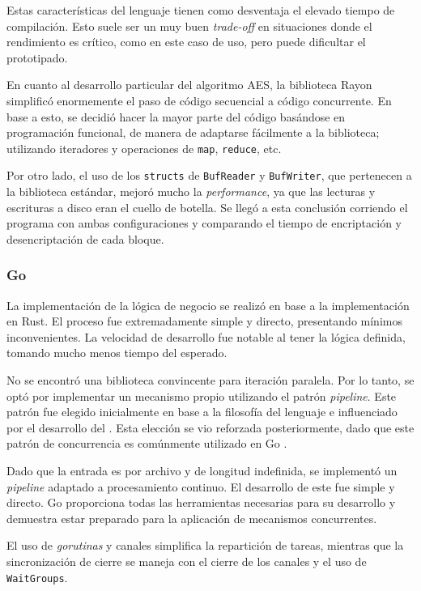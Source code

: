 \documentclass[11pt]{article}
\let\Oldsubsubsection\subsubsection
\renewcommand{\subsubsection}{\FloatBarrier\Oldsubsubsection}
\newcommand{\english}[1]{\textit{#1}}
\begin{document}
Estas características del lenguaje tienen como desventaja el elevado tiempo de compilación. Esto suele ser un muy buen \english{trade-off} en situaciones donde el rendimiento es crítico, como en este caso de uso, pero puede dificultar el prototipado.

En cuanto al desarrollo particular del algoritmo AES, la biblioteca Rayon simplificó enormemente el paso de código secuencial a código concurrente. En base a esto, se decidió hacer la mayor parte del código basándose en programación funcional, de manera de adaptarse fácilmente a la biblioteca; utilizando iteradores y operaciones de \lstinline{map}, \lstinline{reduce}, etc.

Por otro lado, el uso de los \lstinline{structs} de \lstinline{BufReader} y \lstinline{BufWriter}, que pertenecen a la biblioteca estándar, mejoró mucho la \english{performance}, ya que las lecturas y escrituras a disco eran el cuello de botella. Se llegó a esta conclusión corriendo el programa con ambas configuraciones y comparando el tiempo de encriptación y desencriptación de cada bloque.

\subsubsection{Go}


La implementación de la lógica de negocio se realizó en base a la implementación en Rust. El proceso fue extremadamente simple y directo, presentando mínimos inconvenientes. La velocidad de desarrollo fue notable al tener la lógica definida, tomando mucho menos tiempo del esperado.

No se encontró una biblioteca convincente para iteración paralela. Por lo tanto, se optó por implementar un mecanismo propio utilizando el patrón \textit{pipeline}. Este patrón fue elegido inicialmente en base a la filosofía del lenguaje \cite{go:ex:sharing} e influenciado por el desarrollo del . Esta elección se vio reforzada posteriormente, dado que este patrón de concurrencia es comúnmente utilizado en Go \cite{go:ex:pipelines}.

Dado que la entrada es por archivo y de longitud indefinida, se implementó un \textit{pipeline} adaptado a procesamiento continuo. El desarrollo de este fue simple y directo. Go proporciona todas las herramientas necesarias para su desarrollo y demuestra estar preparado para la aplicación de mecanismos concurrentes.

El uso de \textit{gorutinas} y canales simplifica la repartición de tareas, mientras que la sincronización de cierre se maneja con el cierre de los canales y el uso de \lstinline{WaitGroups}.
\end{document}
